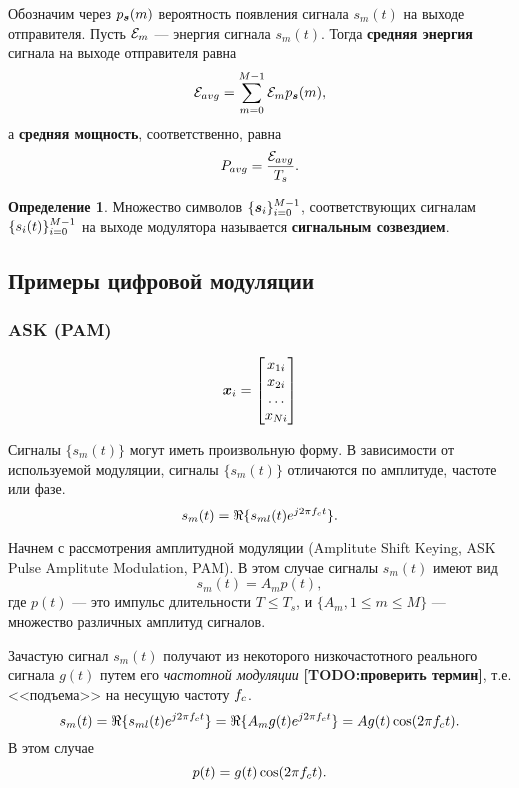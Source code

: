 \documentclass{book}
\numberwithin{theorem}{chapter}
\numberwithin{statement}{chapter}
\numberwithin{lemma}{chapter}
\theoremstyle{definition}
\numberwithin{task}{chapter}
\theoremstyle{remark}
\numberwithin{example}{chapter}
\theoremstyle{definition}
\newtheorem{definition}{Определение}
\numberwithin{definition}{chapter}
\theoremstyle{remark}
\theoremstyle{remark}
\numberwithin{lyrics}{section}
\newcommand{\TODO}[1]{\textbf{[TODO:#1]}}
\newcommand{\translation}[1]{}
\begin{document}
Обозначим через $p_{\bm{s}}(m)$ вероятность появления сигнала $s_m(t)$ на выходе отправителя. Пусть $\mathcal{E}_m$ --- энергия сигнала $s_m(t)$. Тогда \textbf{средняя энергия\translation{average energy}} сигнала на выходе отправителя равна
$$
\mathcal{E}_{avg} = \sum\limits_{m = 0}^{M - 1} \mathcal{E}_m p_{\bm{s}}(m),
$$
а \textbf{средняя мощность\translation{average power}}, соответственно, равна
$$
P_{avg} = \frac{\mathcal{E}_{avg}}{T_s}.
$$


\begin{definition}
Множество символов $\{\bm{s}_i\}_{i = 0}^{M - 1}$, соответствующих сигналам $\{s_i(t)\}_{i=0}^{M-1}$ на выходе модулятора называется \textbf{сигнальным созвездием\translation{signal constellation}}.
\end{definition}

\subsection{Примеры цифровой модуляции}
\subsubsection{ASK (PAM)}
$$
\bm{x}_i = 
\begin{bmatrix}
x_{1i} \\
x_{2i} \\
\dots  \\
x_{N i} \\
\end{bmatrix}
$$

Сигналы $\{s_m(t)\}$ могут иметь произвольную форму. В зависимости от используемой модуляции, сигналы $\{s_m(t)\}$ отличаются по амплитуде, частоте или фазе.
$$s_m(t) = \Re\{s_{ml}(t)e^{j2\pi f_c t}\}.$$

Начнем с рассмотрения амплитудной модуляции (Amplitute Shift Keying, ASK Pulse Amplitute Modulation, PAM). В этом случае сигналы $s_m(t)$ имеют вид
\begin{equation}
s_m(t) = A_m p(t),
\end{equation}
где $p(t)$ --- это импульс длительности $T \le T_s$, и $\{A_m, 1 \le m \le M\}$ --- множество различных амплитуд сигналов.

Зачастую сигнал $s_m(t)$ получают из некоторого низкочастотного реального сигнала $g(t)$ путем его \emph{частотной модуляции} \TODO{проверить термин}, т.е. <<подъема>> на несущую частоту $f_c$.
\begin{equation}
\label{eq:phy:mod:ask:carrier_modulated_ask_signal}
s_m(t) = \Re\{s_{ml}(t)e^{j2\pi f_c t}\} = \Re\{A_m g(t) e^{j2\pi f_c t}\} = A g(t) \cos(2\pi f_c t).
\end{equation}
В этом случае 
\begin{equation}
\notag
p(t) = g(t) \cos(2 \pi f_c t).
\end{equation}
\end{document}
